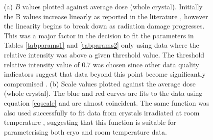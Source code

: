 \begin{figure}
\begin{subfigure}[b]{0.825\textwidth}
                \caption{}
                \label{figscalevalues}
        \end{subfigure}
        \caption{(a) $B$ values plotted against average dose (whole crystal). Initially the B values increase linearly as reported in the literature \cite{kmetko2006, warkentin2010, leal2012}, however the linearity begins to break down as radiation damage progresses. This was a major factor in the decision to fit the parameters in Tables \ref{tabparams1} and \ref{tabparams2} only using data where the relative intensity was above a given threshold value. The threshold relative intensity value of 0.7 was chosen since other data quality indicators suggest that data beyond this point become significantly compromised \cite{owen2006}. (b) Scale values plotted against the average dose (whole crystal). The blue and red curves are fits to the data using equation \ref{eqscale} and are almost coincident. The same function was also used successfully to fit data from crystals irradiated at room temperature \cite{leal2012}, suggesting that this function is suitable for parameterising both cryo and room temperature data.}
        \label{figlealparam}
\end{figure}

